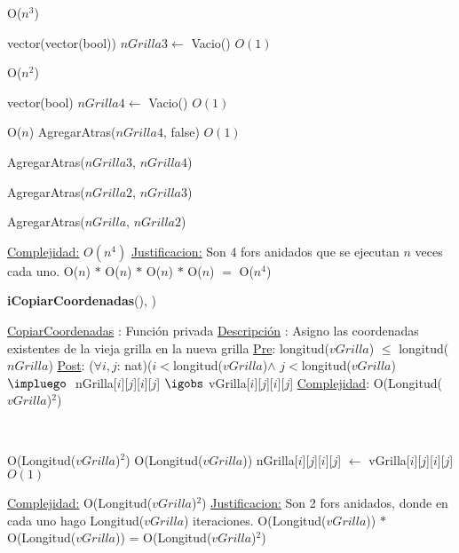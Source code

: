 \begin{Algoritmos}
\begin{algorithm}[H]
\begin{algorithmic}[1]
	  \Comment O($n^3$)
	
		\State vector(vector(bool)) $nGrilla3 \gets$ Vacio()   \Comment $O(1)$
		
		  \Comment O($n^2$)

			\State vector(bool) $nGrilla4 \gets$ Vacio() \Comment $O(1)$
			
			   \Comment O($n$)
			 	\State AgregarAtras($nGrilla4$, false) \Comment $O(1)$			 	
			 \EndFor		
			 
			 \State AgregarAtras($nGrilla3$, $nGrilla4$)
		
		\EndFor
		
		\State AgregarAtras($nGrilla2$, $nGrilla3$)
	
	\EndFor
	
	\State AgregarAtras($nGrilla$, $nGrilla2$)


\EndFor

\medskip
\Statex \underline{Complejidad:} $O(n^4)$
\Statex \underline{Justificacion:} Son 4 fors anidados que se ejecutan $n$ veces cada uno. O($n$) $*$ O($n$) $*$ O($n$) $*$ O($n$) $=$  O($n^4$)
 
\end{algorithmic}
\end{algorithm}



\begin{algorithm}[H]
{\textbf{iCopiarCoordenadas}(), )}
\begin{algorithmic}[1]

\Statex \underline{CopiarCoordenadas} : Funci\'on privada 
\Statex \underline{Descripci\'on} : Asigno las coordenadas existentes de la vieja grilla en la nueva grilla
\Statex \underline{Pre}: longitud($vGrilla$) $\leq$ longitud($nGrilla$)
\Statex \underline{Post}: ($\forall i, j$: nat)($i < $longitud($vGrilla$)$ \land$ $j < $longitud($vGrilla$) $\impluego$
\Statex $ $\hspace*{2cm} nGrilla[$i$][$j$][$i$][$j$] $\igobs$ vGrilla[$i$][$j$][$i$][$j$]
\Statex \underline{Complejidad}: O(Longitud($vGrilla$)$^2$) 

\Statex $ $
\Statex $ $

  \Comment O(Longitud($vGrilla$)$^2$)
	  \Comment O(Longitud($vGrilla$))
		\State nGrilla[$i$][$j$][$i$][$j$] $\gets$ vGrilla[$i$][$j$][$i$][$j$] \Comment $O(1)$
	\EndFor
\EndFor


\medskip
\Statex \underline{Complejidad:}  \Comment O(Longitud($vGrilla$)$^2$)
\Statex \underline{Justificacion:} Son 2 fors anidados, donde en cada uno hago Longitud($vGrilla$) iteraciones. O(Longitud($vGrilla$)) $*$ O(Longitud($vGrilla$)) = O(Longitud($vGrilla$)$^2$)
\end{algorithmic}
\end{algorithm}

\end{Algoritmos}


